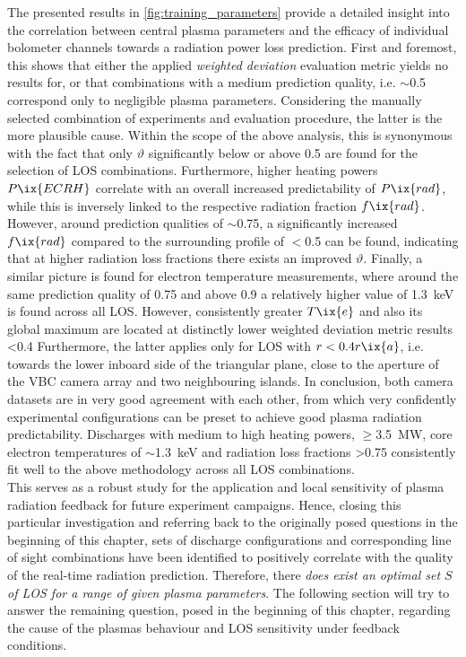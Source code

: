             The presented results in \cref{fig:training_parameters} provide a detailed insight into the correlation between central plasma parameters and the efficacy of individual bolometer channels towards a radiation power loss prediction. First and foremost, this shows that either the applied \textit{weighted deviation} evaluation metric yields no results for, or that combinations with a medium prediction quality, i.e. $\sim$\SI{0.5}{\arbitraryunit} correspond only to negligible plasma parameters. Considering the manually selected combination of experiments and evaluation procedure, the latter is the more plausible cause.  Within the scope of the above analysis, this is synonymous with the fact that only $\vartheta$ significantly below or above \SI{0.5}{\arbitraryunit} are found for the selection of LOS combinations. Furthermore, higher heating powers $P\ix{ECRH}$ correlate with an overall increased predictability of $P\ix{rad}$, while this is inversely linked to the respective radiation fraction $f\ix{rad}$. However, around prediction qualities of $\sim$\SI{0.75}{\arbitraryunit}, a significantly increased $f\ix{rad}$ compared to the surrounding profile of $<$\SI{0.5}{\arbitraryunit} can be found, indicating that at higher radiation loss fractions there exists an improved $\vartheta$. Finally, a similar picture is found for electron temperature measurements, where around the same prediction quality of \SI{0.75}{\arbitraryunit} and above \SI{0.9}{\arbitraryunit} a relatively higher value of \SI{1.3}{\kilo\electronvolt} is found across all LOS. However, consistently greater $T\ix{e}$ and also its global maximum are located at distinctly lower weighted deviation metric results <\SI{0.4}{\arbitraryunit} Furthermore, the latter applies only for LOS with $r<0.4r\ix{a}$, i.e. towards the lower inboard side of the triangular plane, close to the aperture of the VBC camera array and two neighbouring islands. In conclusion, both camera datasets are in very good agreement with each other, from which very confidently experimental configurations can be preset to achieve good plasma radiation predictability. Discharges with medium to high heating powers, $\ge$\SI{3.5}{\mega\watt}, core electron temperatures of $\sim$\SI{1.3}{\kilo\electronvolt} and radiation loss fractions >\SI{0.75}{\arbitraryunit} consistently fit well to the above methodology across all LOS combinations.\\%
%
            \newline%
            This serves as a robust study for the application and local sensitivity of plasma radiation feedback for future experiment campaigns. Hence, closing this particular investigation and referring back to the originally posed questions in the beginning of this chapter, sets of discharge configurations and corresponding line of sight combinations have been identified to positively correlate with the quality of the real-time radiation prediction. Therefore, there \textit{does exist an optimal set $S$ of LOS for a range of given plasma parameters}. The following section will try to answer the remaining question, posed in the beginning of this chapter, regarding the cause of the plasmas behaviour and LOS sensitivity under feedback conditions.%
%
